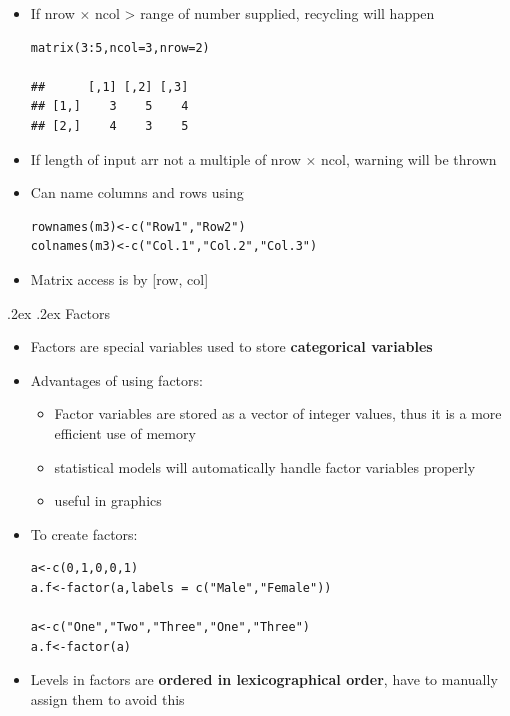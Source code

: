 \documentclass[landscape,a4paper]{article}
\makeatletter
\renewcommand{\subsubsection}{\@startsection{subsubsection}{1}{0mm}%
	{.2ex}%
	{.2ex}%
	{\rmfamily\bfseries}}
\makeatother
\begin{document}
\begin{multicols*}{4}
\begin{itemize}
\begin{verbatim}
matrix(3:8,nrow=2)

m2<-3:8
dim(m2)<-c(2,3)

##      [,1] [,2]
## [1,]    3    6
## [2,]    4    7
## [3,]    5    8
			\end{verbatim}
			\item If nrow $\times$ ncol > range of number supplied, recycling will happen
			\begin{verbatim}
matrix(3:5,ncol=3,nrow=2)

##      [,1] [,2] [,3]
## [1,]    3    5    4
## [2,]    4    3    5
			\end{verbatim}
			\item If length of input arr not a multiple of nrow $\times$ ncol, warning will be thrown
			\item Can name columns and rows using
			\begin{verbatim}
rownames(m3)<-c("Row1","Row2")
colnames(m3)<-c("Col.1","Col.2","Col.3")
			\end{verbatim}
			\item Matrix access is by [row, col]
		\end{itemize}
		\subsubsection{Factors}
		\begin{itemize}
			\item Factors are special variables used to store \textbf{categorical variables}
			\item Advantages of using factors:
			\begin{itemize}
				\item Factor variables are stored as a vector of integer values, thus it is a more efficient use of memory
				\item statistical models will automatically handle factor variables properly
				\item useful in graphics
			\end{itemize}
			\item To create factors:
			\begin{verbatim}
a<-c(0,1,0,0,1)
a.f<-factor(a,labels = c("Male","Female"))

a<-c("One","Two","Three","One","Three")
a.f<-factor(a)
			\end{verbatim}
			\item Levels in factors are \textbf{ordered in lexicographical order}, have to manually assign them to avoid this
		\end{itemize}

\end{multicols*}
\end{document}
